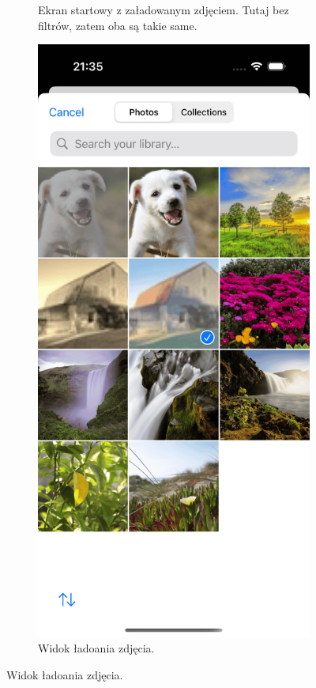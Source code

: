\documentclass[a4paper]{article}
\begin{document}
\begin{figure}[H]
\begin{subfigure}{0.2\textwidth}
        \caption{Ekran startowy z załadowanym zdjęciem. Tutaj bez filtrów, zatem oba są takie same.}
        \label{fig:home}
    \end{subfigure}
    \begin{subfigure}{0.2\textwidth}
        \centering
        \includegraphics[width=\linewidth]{images/image_load.png}
        \caption{Widok ładoania zdjęcia.}
        \label{fig:image_load}
    \end{subfigure}
    \label{fig:home_screen}
\end{figure}
\end{document}
